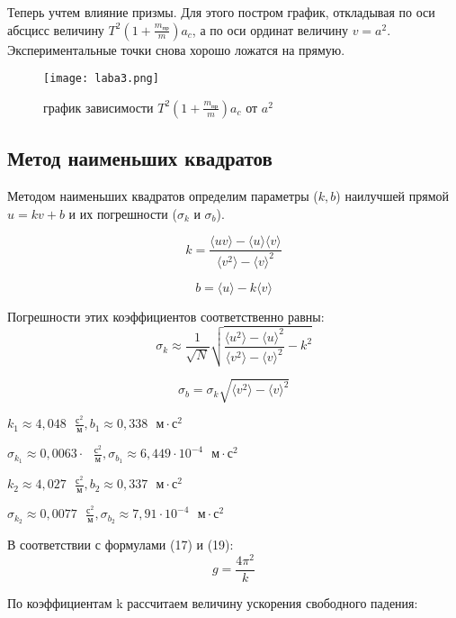 \documentclass[a5paper, 11pt]{article}
\begin{document}
\newpage
Теперь учтем влияние призмы. Для этого постром график, откладывая по оси абсцисс величину $T^2 (1 + \frac{m_\text{пр}}{m}) a_{c}$, а по оси ординат величину $v = a^2$. Экспериментальные точки снова хорошо ложатся на прямую.

\begin{figure}[H]
	
	\centering
	\texttt{[image: laba3.png]}
	\caption{график зависимости $T^2 (1 + \frac{m_\text{пр}}{m}) a_{c}$ от $a^2$}
	
\end{figure}

\newpage
\subsection{Метод наименьших квадратов}

Методом наименьших квадратов определим параметры ($k, b$) наилучшей прямой $u = kv + b$ и их погрешности ($\sigma_k$ и $\sigma_b$).

\[k = \frac{\langle uv\rangle - \langle u\rangle \langle v\rangle}{\langle v^2 \rangle - \langle v \rangle^2} \]

\[b = \langle u \rangle - k\langle v \rangle \]

Погрешности этих коэффициентов соответственно равны:
\[\sigma_k \approx \frac{1}{\sqrt{N}}\sqrt{\frac{\langle u^2 \rangle - \langle u \rangle^2} {\langle v^2 \rangle - \langle v \rangle^2} - k^2} \]

\[\sigma_b = \sigma_k \sqrt{\langle v^2 \rangle - \langle v \rangle^2} \]

$k_1 \approx 4,048\text{ }\frac{\text{с}^2}{\text{м}}, b_1 \approx 0,338 \text{ }\text{м}\cdot\text{с}^2$  

$\sigma_{k_1} \approx 0,0063\cdot \text{ }\frac{\text{с}^2}{\text{м}},  \sigma_{b_1} \approx 6,449 \cdot 10^{-4} \text{ }\text{м}\cdot\text{с}^2$

$k_2 \approx 4,027\text{ }\frac{\text{с}^2}{\text{м}}, b_2 \approx 0,337 \text{ }\text{м}\cdot\text{с}^2 $ 

$\sigma_{k_2}  \approx 0,0077 \text{ }\frac{\text{с}^2}{\text{м}},  \sigma_{b_2} \approx 7,91 \cdot 10^{-4} \text{ }\text{м}\cdot\text{с}^2$

В соответствии с формулами (17) и (19):
\begin{equation}
	g = \frac{4\pi^2}{k}
\end{equation}

По коэффициентам k рассчитаем величину ускорения свободного падения:
 
\end{document}
